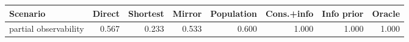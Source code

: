 \begin{tabular}{lrrrrrrr}
\toprule
Scenario & Direct & Shortest & Mirror & Population & Cons.+info & Info prior & Oracle \\
\midrule
partial observability & 0.567 & 0.233 & 0.533 & 0.600 & 1.000 & 1.000 & 1.000 \\
\bottomrule
\end{tabular}
